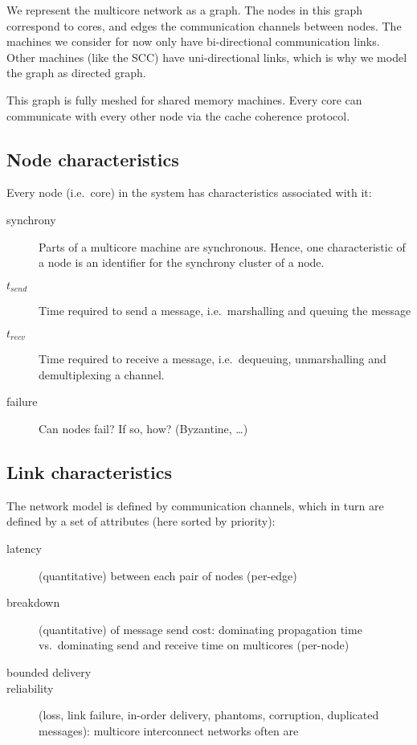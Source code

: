 \documentclass{article}
\begin{document}
We represent the multicore network as a graph. The nodes in this graph
correspond to cores, and edges the communication channels between
nodes. The machines we consider for now only have bi-directional
communication links. Other machines (like the SCC) have
uni-directional links, which is why we model the graph as directed
graph.

This graph is fully meshed for shared memory machines. Every core can
communicate with every other node via the cache coherence protocol.

\subsection{Node characteristics} 

Every node (i.e.\ core) in the system has characteristics associated
with it:

\begin{description}
\item[synchrony] Parts of a multicore machine are synchronous. Hence,
  one characteristic of a node is an identifier for the synchrony
  cluster of a node.
\item[$t_{send}$] Time required to send a message, i.e.\ marshalling
  and queuing the message
\item[$t_{recv}$] Time required to receive a message, i.e.\
  dequeuing, unmarshalling and demultiplexing a channel.
\item[failure] Can nodes fail? If so, how? (Byzantine, \ldots)
\end{description}

\subsection{Link characteristics} 

The network model is defined by communication channels, which in turn
are defined by a set of attributes (here sorted by priority):

\begin{description}
\item[latency] (quantitative) between each pair of nodes (per-edge)
\item[breakdown] (quantitative) of message send cost:
  dominating propagation time vs.\ dominating send and receive time on
  multicores (per-node)
\item[bounded delivery]
\item[reliability] (loss, link failure, in-order delivery, phantoms,
  corruption, duplicated messages): 
  multicore interconnect networks often are
\end{description}
\end{document}
